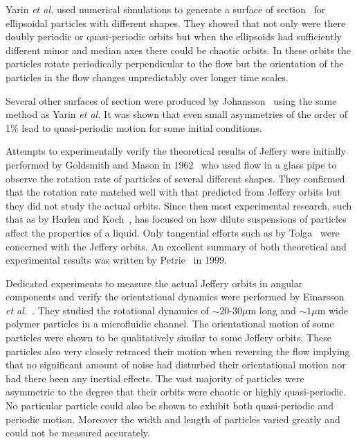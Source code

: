 Yarin \emph{et al.} used numerical simulations to generate a surface of section~\cite{SurfaceOfSection} for ellipsoidal particles with different shapes. They showed that not only were there doubly periodic or quasi-periodic orbits but when the ellipsoids had sufficiently different minor and median axes there could be chaotic orbits. In these orbits the particles rotate periodically perpendicular to the flow but the orientation of the particles in the flow changes unpredictably over longer time scales. %

Several other surfaces of section were produced by Johansson~\cite{AntonThesis} using the same method as Yarin \emph{et al.} It was shown that even small asymmetries of the order of 1\% lead to quasi-periodic motion for some initial conditions.

Attempts to experimentally verify the theoretical results of Jeffery were initially performed by Goldsmith and Mason in 1962~\cite{Mason} who used flow in a glass pipe to observe the rotation rate of particles of several different shapes. They confirmed that the rotation rate matched well with that predicted from Jeffery orbits but they did not study the actual orbits. Since then most experimental research, such that as by Harlen and Koch~\cite{fibersspension}, has focused on how dilute suspensions of particles affect the properties of a liquid. Only tangential efforts such as by Tolga~\cite{Tolga} were concerned with the Jeffery orbits. An excellent summary of both theoretical and experimental results was written by Petrie~\cite{Petrie} in 1999.

Dedicated experiments to measure the actual Jeffery orbits in angular components and verify the orientational dynamics were performed by Einarsson \emph{et al.}~\cite{JonasExperiment}. They studied the rotational dynamics of ${\sim} 20$-$30\mu$m long and ${\sim} 1\mu$m wide polymer particles in a microfluidic channel. The orientational motion of some particles were shown to be qualitatively similar to some Jeffery orbits. These particles also very closely retraced their motion when reversing the flow implying that no significant amount of noise had disturbed their orientational motion nor had there been any inertial effects. The vast majority of particles were asymmetric to the degree that their orbits were chaotic or highly quasi-periodic. No particular particle could also be shown to exhibit both quasi-periodic and periodic motion. Moreover the width and length of particles varied greatly and could not be measured accurately.


